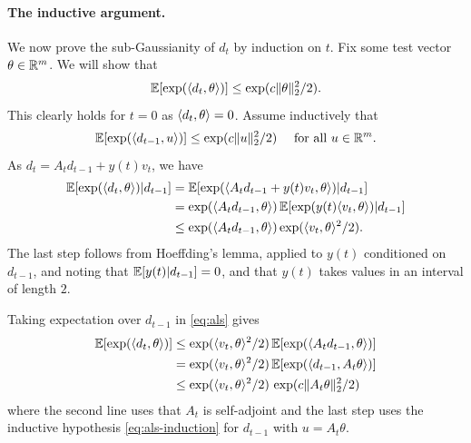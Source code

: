 \paragraph{The inductive argument.}
We now prove the sub-Gaussianity of $d_t$ by induction on $t$.
Fix some test vector $\theta \in \mathbb{R}^m$. We will show that \[\mathbb{E} [\exp(\langle d_t,\theta\rangle)] \leq \exp(c \|\theta\|_2^2/2).\]
This clearly holds for $t=0$ as $\langle d_t,\theta\rangle=0$.
Assume inductively that 
\begin{equation}
    \label{eq:als-induction}
    \mathbb{E}[\exp(\langle d_{t-1},u\rangle)]\leq \exp(c\|u\|_2^2/2) \quad \text{ for all } u \in \mathbb{R}^m.
\end{equation}
As $d_t = A_t d_{t-1} +y(t) v_t $, we have 
\begin{align}
\mathbb{E} [\exp(\langle d_t,\theta \rangle) |d_{t-1}] & =   \mathbb{E} [\exp(\langle A_t d_{t-1}+y(t) v_t,\theta\rangle) |d_{t-1}] \notag  \\
 &=   \exp( \langle A_t d_{t-1}, \theta \rangle) \, {\mathbb{E} [\exp(y(t) \langle  v_t,\theta \rangle) | d_{t-1}]} \notag \\
& \leq \exp( \langle A_t d_{t-1}, \theta \rangle)   \exp(\langle v_t,\theta\rangle^2/2).\label{eq:als} 
 \end{align}
 The last step follows from Hoeffding's lemma,
applied to $y(t)$ conditioned on $d_{t-1}$, and noting that
$\mathbb{E}[y(t)|d_{t-1}]=0$, and that $y(t)$ takes values in an interval of
length $2$. 

Taking expectation over $d_{t-1}$ in \eqref{eq:als}  gives
\begin{align}
    \mathbb{E} [\exp(\langle d_t,\theta \rangle)] 
                      & \leq  \exp(\langle v_t,\theta \rangle^2/2)\, \mathbb{E} [\exp( \langle A_t d_{t-1}, \theta \rangle)] \notag \\
                      & =  \exp(\langle v_t,\theta \rangle^2/2) \,\mathbb{E} [\exp( \langle  d_{t-1}, A_t \theta \rangle)]  \notag \\
                      &  \leq \exp(\langle v_t,\theta \rangle^2/2) \,\exp( c \|A_t \theta \|_2^2 /2\label{eq:als-final} ) 
\end{align}
where the second line uses that $A_t$ is self-adjoint and the last step uses the inductive hypothesis \eqref{eq:als-induction} for $d_{t-1}$ with $u=A_t \theta $.

